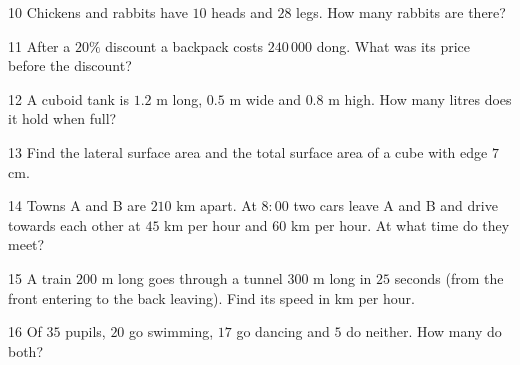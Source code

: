 \gap
\begin{probbox}{10}{\relax}
Chickens and rabbits have $10$ heads and $28$ legs. How many rabbits are there?
\end{probbox}
\begin{probbox}{11}{\relax}
After a $20\%$ discount a backpack costs $240\,000$ dong. What was its price before the discount?
\end{probbox}
\gap
\begin{probbox}{12}{\relax}
A cuboid tank is $1.2$ m long, $0.5$ m wide and $0.8$ m high. How many litres does it hold when full?
\end{probbox}
\gap
\begin{probbox}{13}{\relax}
Find the lateral surface area and the total surface area of a cube with edge $7$ cm.
\end{probbox}
\gap
\begin{probbox}{14}{\relax}
Towns A and B are $210$ km apart. At $8{:}00$ two cars leave A and B and drive towards each other at $45$ km per hour and $60$ km per hour. At what time do they meet?
\end{probbox}
\gap
\begin{probbox}{15}{\relax}
A train $200$ m long goes through a tunnel $300$ m long in $25$ seconds (from the front entering to the back leaving). Find its speed in km per hour.
\end{probbox}
\gap
\begin{probbox}{16}{\relax}
Of $35$ pupils, $20$ go swimming, $17$ go dancing and $5$ do neither. How many do both?
\end{probbox}
